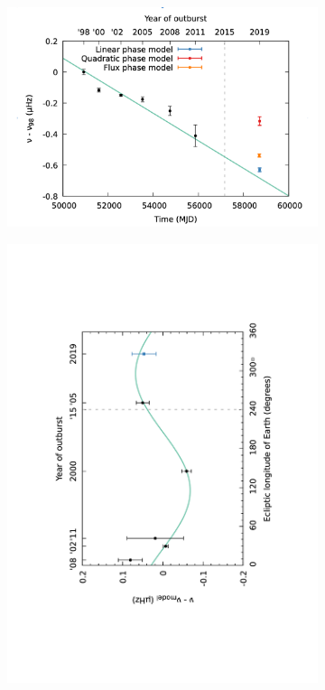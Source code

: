 \documentclass[graybox]{svmult}
\begin{document}
\begin{figure}
\begin{subfigure}{.5\textwidth}
  \centering
  \includegraphics[width=.8\linewidth]{REVIEW_AMXP/1808_secular_3}
  \label{fig:sfig1}
\end{subfigure}%
\begin{subfigure}{.5\textwidth}
  \centering
  \includegraphics[angle=-90,width=1.1\linewidth]{REVIEW_AMXP/1808_new_pos}

\end{subfigure}
\end{figure}
\end{document}
